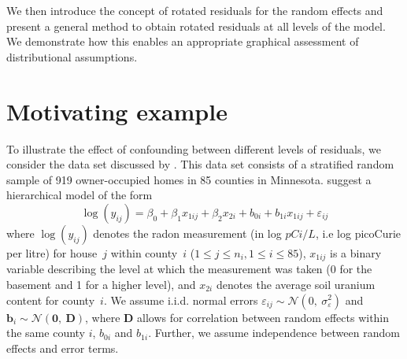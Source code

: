 \documentclass[12pt]{article} %
\newcommand{\al}[1]{{\color{red} #1}}
\begin{document}
We then introduce  the concept of rotated residuals for the random effects and present a general method to obtain rotated residuals at all levels of the model. We demonstrate how this enables an appropriate graphical assessment  of distributional assumptions. %


\section{Motivating example}\label{sec:ex}
To illustrate the effect of confounding between different levels of residuals, we consider the data set discussed by
 \cite{Gelman:2006ue}. This data set consists of a stratified random sample of 919 owner-occupied homes in 85 counties in Minnesota.  \cite{Gelman:2006ue}  suggest a hierarchical model of the form
%
\begin{equation}\label{eq:radon}
  \log(y_{ij}) = \beta_0 + \beta_1 x_{1ij} + \beta_2 x_{2i} + b_{0i} + b_{1i} x_{1ij}  + \varepsilon_{ij}
\end{equation}
%
where   $\log(y_{ij})$ denotes the  radon measurement (in log $pCi/L$, i.e log picoCurie per litre) for house~$j$ within county~$i$ ($1 \le j \le n_i, 1 \le i \le 85$),
 $x_{1ij}$ is a binary variable describing the level at which the measurement was taken (0 for the basement and 1 for a higher level), and $x_{2i}$ denotes the average soil uranium content for  county~$i$. 
 We assume i.i.d. normal errors $\varepsilon_{ij} \sim \mathcal{N} (0,\ \sigma^2_{\varepsilon})$  and $\bm{b}_i \sim \mathcal{N}(\bm{0},\ \bm{D})$, where $\bm{D}$ allows for correlation between random effects within the same county $i$, $b_{0i}$ and $b_{1i}$. Further, we assume independence between random effects and error terms. 
\end{document}
